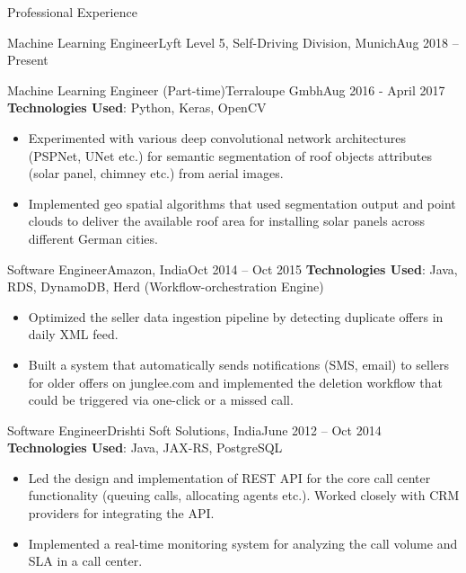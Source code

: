 \documentclass[]{mcdowellcv}
\begin{document}
\begin{cvsection}{Professional Experience}
\begin{cvsubsection}{Machine Learning Engineer}{Lyft Level 5, Self-Driving Division, Munich}{Aug 2018 -- Present}
		\end{cvsubsection}
		
		
		\begin{cvsubsection}{Machine Learning Engineer (Part-time)}{Terraloupe Gmbh}{Aug 2016 - April 2017}
		\textbf{ } \\
			\textbf{Technologies Used}: Python, Keras, OpenCV
			\begin{itemize}
				\item Experimented with various deep convolutional network architectures (PSPNet, UNet etc.) for semantic segmentation of roof objects attributes (solar panel, chimney etc.) from aerial images.
				\item Implemented geo spatial algorithms that used segmentation output and point clouds to deliver the available roof area for installing solar panels across different German cities.
			\end{itemize}
		\end{cvsubsection}
		
		
		\begin{cvsubsection}{Software Engineer}{Amazon, India}{Oct 2014 -- Oct 2015}  
			\textbf{Technologies Used}: Java, RDS, DynamoDB, Herd (Workflow-orchestration Engine)
			\begin{itemize}
				\item Optimized the seller data ingestion pipeline by detecting duplicate offers in daily XML feed.
				\item Built a system that automatically sends notifications (SMS, email) to sellers for older offers on junglee.com and implemented the deletion
				workflow that could be triggered via one-click or a missed call.
			\end{itemize}
		\end{cvsubsection}
		
		\begin{cvsubsection}{Software Engineer}{Drishti Soft Solutions, India}{June 2012 -- Oct 2014}
			\textbf{Technologies Used}: Java, JAX-RS, PostgreSQL
			\begin{itemize} 
				\item Led the design and implementation of REST API for the core call center functionality (queuing calls, allocating agents etc.). Worked closely with CRM providers for integrating the API.
				\item Implemented a real-time monitoring system for analyzing the call volume and SLA in a call center. 
			\end{itemize}
		\end{cvsubsection}
	\end{cvsection}
	
\end{document}
